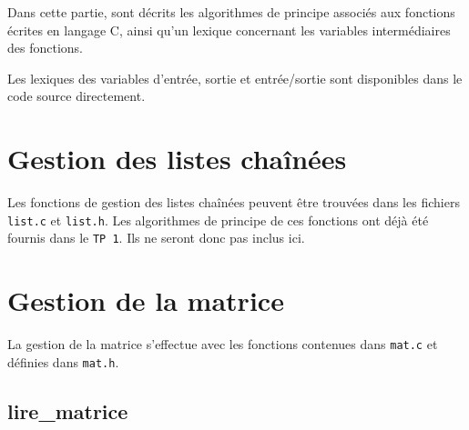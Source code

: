 Dans cette partie, sont décrits les algorithmes de principe associés aux fonctions écrites en langage C, ainsi qu'un lexique concernant les variables intermédiaires des fonctions.

Les lexiques des variables d'entrée, sortie et entrée/sortie sont disponibles dans le code source directement.

\section{Gestion des listes chaînées}
  Les fonctions de gestion des listes chaînées peuvent être trouvées dans les fichiers \texttt{list.c} et \texttt{list.h}.
  Les algorithmes de principe de ces fonctions ont déjà été fournis dans le \texttt{TP 1}. Ils ne seront donc pas inclus ici.

\section{Gestion de la matrice}
  La gestion de la matrice s'effectue avec les fonctions contenues dans \texttt{mat.c} et définies dans \texttt{mat.h}.
    
  \newpage
\subsection{lire\_matrice}
  \begin{algo}[informal] %
    \BEGIN
          \ENDIF
        \ENDWHILE
      \ELSE
      \ENDIF
    \END
  \end{algo}
  
  \begin{algo}[informal] %
    \VAR
    \ENDVAR
  \end{algo}
  
